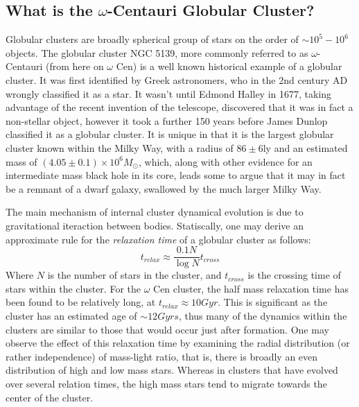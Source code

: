 \documentclass[aps,
                pra,  
                a4paper, 
                amsmath, 
                amssymb, 
                preprint,
                tightenlines,  
                amsfonts,
                nofootinbib,
            ]{revtex4-2}
\begin{document}
\subsection{What is the $\omega$-Centauri Globular Cluster?}
Globular clusters are broadly spherical group of stars on the order of $\sim10^5-10^6$ objects. The globular cluster NGC 5139, more commonly referred to as $\omega$-Centauri (from here on $\omega$ Cen) is a well known historical example of a globular cluster. It was first identified by Greek astronomers, who in the 2nd century AD wrongly classified it as a star. It wasn't until Edmond Halley in 1677, taking advantage of the recent invention of the telescope, discovered that it was in fact a non-stellar object, however it took a further 150 years before James Dunlop classified it as a globular cluster. It is unique in that it is the largest globular cluster known within the Milky Way, with a radius of $86\pm6$ly and an estimated mass of $(4.05\pm0.1)\times10^6M_{\odot}$, which, along with other evidence for an intermediate mass black hole in its core, leads some to argue that it may in fact be a remnant of a dwarf galaxy, swallowed by the much larger Milky Way.
\par
The main mechanism of internal cluster dynamical evolution is due to gravitational iteraction between bodies. Statiscally, one may derive an approximate rule for the \textit{relaxation time} of a globular cluster as follows:
\begin{equation}
    t_{relax}\approx\frac{0.1N}{\log{N}}t_{cross}
\end{equation}
Where $N$ is the number of stars in the cluster, and $t_{cross}$ is the crossing time of stars within the cluster. For the $\omega$ Cen cluster, the half mass relaxation time has been found to be relatively long, at $t_{relax}\approx 10Gyr$. This is significant as the cluster has an estimated age of $\sim 12Gyrs$, thus many of the dynamics within the clusters are similar to those that would occur just after formation. One may observe the effect of this relaxation time by examining the radial distribution (or rather independence) of mass-light ratio, that is, there is broadly an even distribution of high and low mass stars. Whereas in clusters that have evolved over several relation times, the high mass stars tend to migrate towards the center of the cluster.
\par
\end{document}
